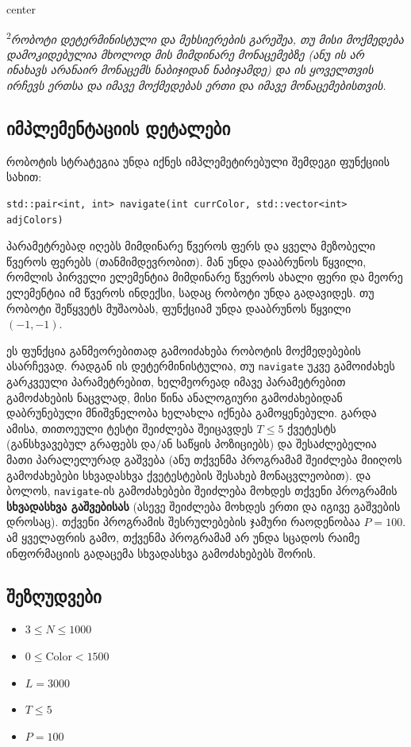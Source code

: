 \documentclass[12pt]{article}
\begin{document}
\begin{adjustbox}{center}

\end{adjustbox}

\textsuperscript{2}\textit{რობოტი დეტერმინისტული და მეხსიერების გარეშეა, თუ მისი მოქმედება დამოკიდებულია მხოლოდ მის მიმდინარე მონაცემებზე (ანუ ის არ ინახავს არანაირ მონაცემს ნაბიჯიდან ნაბიჯამდე) და ის ყოველთვის ირჩევს ერთსა და იმავე მოქმედებას ერთი და იმავე მონაცემებისთვის.}

\subsection{იმპლემენტაციის დეტალები}
რობოტის სტრატეგია უნდა იქნეს იმპლემეტირებული შემდეგი ფუნქციის სახით:
\begin{lstlisting}
std::pair<int, int> navigate(int currColor, std::vector<int> adjColors)
\end{lstlisting}

პარამეტრებად იღებს მიმდინარე წვეროს ფერს და ყველა მეზობელი წვეროს ფერებს (თანმიმდევრობით). მან უნდა დააბრუნოს წყვილი, რომლის პირველი ელემენტია მიმდინარე წვეროს ახალი ფერი და  მეორე ელემენტია იმ წვეროს ინდექსი, სადაც რობოტი უნდა გადავიდეს. თუ რობოტი შეწყვეტს მუშაობას, ფუნქციამ უნდა დააბრუნოს წყვილი $(-1, -1)$.

ეს ფუნქცია განმეორებითად გამოიძახება რობოტის მოქმედებების ასარჩევად. რადგან ის დეტერმინისტულია, თუ \texttt{navigate} უკვე გამოიძახეს გარკვეული პარამეტრებით, ხელმეორეად იმავე პარამეტრებით გამოძახების ნაცვლად, მისი წინა ანალოგიური გამოძახებიდან დაბრუნებული მნიშვნელობა ხელახლა იქნება გამოყენებული. გარდა ამისა, თითოეული ტესტი შეიძლება შეიცავდეს $T \leq 5$ ქვეტესტს (განსხვავებულ გრაფებს და/ან საწყის პოზიციებს) და შესაძლებელია მათი პარალელურად გაშვება (ანუ თქვენმა პროგრამამ შეიძლება მიიღოს გამოძახებები სხვადასხვა ქვეტესტების შესახებ მონაცვლეობით). და ბოლოს, \texttt{navigate}-ის გამოძახებები შეიძლება მოხდეს თქვენი პროგრამის \textbf{სხვადასხვა გაშვებისას} (ასევე შეიძლება მოხდეს ერთი და იგივე გაშვების დროსაც). თქვენი პროგრამის შესრულებების ჯამური რაოდენობაა $P = 100$. ამ ყველაფრის გამო, თქვენმა პროგრამამ არ უნდა სცადოს რაიმე ინფორმაციის გადაცემა სხვადასხვა გამოძახებებს შორის.

\subsection{შეზღუდვები}

\begin{itemize}
\item $3 \leq N \leq 1000$
\item $0 \leq \mathrm{Color} < 1500$
\item $L = 3000$
\item $T \leq 5$
\item $P = 100$
\end{itemize}
\end{document}
